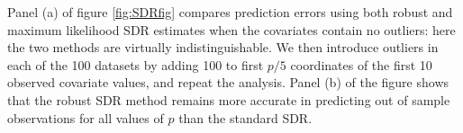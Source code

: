 Panel (a) of figure \ref{fig:SDRfig} compares prediction errors using both robust and 
maximum likelihood SDR estimates when the covariates contain no outliers: here the two 
methods are virtually indistinguishable. We then introduce outliers in each of the 100 
datasets by adding 100 to first $p/5$ coordinates of the first 10 observed covariate 
values, and repeat the analysis. Panel (b) of the figure shows that the robust SDR method 
remains more accurate in predicting out of sample observations for all values of $p$ than 
the standard SDR.



